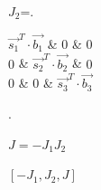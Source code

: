 \begin{algorithm}[H]
{              
              $J_{2}$=\left.    
              \begin{bmatrix}
                 $\overrightarrow{s_{1}}^T \cdot \overrightarrow{b_{1}} $ & $0$ & $0$\\
                $0$ & $\overrightarrow{s_{2}}^T \cdot \overrightarrow{b_{2}}$ & $0$\\
                $0$ & $0$ & $\overrightarrow{s_{3}}^T \cdot \overrightarrow{b_{3}}$
            \end{bmatrix}
            \right.

                $J=-J_{1}J_{2}$\;
                
               
    
              \KwRet $[-J_{1},J_{2},J]$   }
        \end{algorithm}
 

